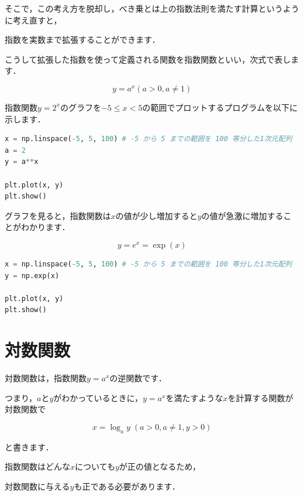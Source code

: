 そこで，この考え方を脱却し，べき乗とは上の指数法則を満たす計算というように考え直すと，

指数を実数まで拡張することができます．

こうして拡張した指数を使って定義される関数を指数関数といい，次式で表します．

\[
y = a^x (a > 0, a \neq 1)
\]


指数関数$y = 2^x$のグラフを$-5 \le x < 5$の範囲でプロットするプログラムを以下に示します．


\begin{lstlisting}[style=codecell,language=Python]
x = np.linspace(-5, 5, 100) # -5 から 5 までの範囲を 100 等分した1次元配列
a = 2
y = a**x

plt.plot(x, y)
plt.show()
\end{lstlisting}


グラフを見ると，指数関数は$x$の値が少し増加すると$y$の値が急激に増加することがわかります．


\[
y = e^x = \exp(x)
\]


\begin{lstlisting}[style=codecell,language=Python]
x = np.linspace(-5, 5, 100) # -5 から 5 までの範囲を 100 等分した1次元配列
y = np.exp(x)

plt.plot(x, y)
plt.show()
\end{lstlisting}


\section{対数関数}

対数関数は，指数関数$y = a^x$の逆関数です．

つまり，$a$と$y$がわかっているときに，$y = a^x$を満たすような$x$を計算する関数が対数関数で

\[
x = \log_a y \; (a > 0, a \neq 1, y > 0)
\]

と書きます．

指数関数はどんな$x$についても$y$が正の値となるため，

対数関数に与える$y$も正である必要があります．


